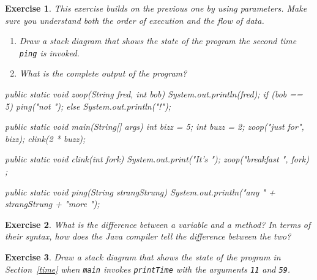 \documentclass[12pt]{book}
\theoremstyle{exercise}
\newtheorem{exercise}{Exercise}[chapter]
\newcommand{\java}[1]{\lstinline{#1}} %
\begin{document}
\begin{exercise}
This exercise builds on the previous one by using parameters.
Make sure you understand both the order of execution and the flow of data.

\begin{enumerate}

\item Draw a stack diagram that shows the state of the program the {\it second} time \java{ping} is invoked.

\item What is the complete output of the program?

\end{enumerate}

\begin{code}
    public static void zoop(String fred, int bob) {
        System.out.println(fred);
        if (bob == 5) {
            ping("not ");
        } else {
            System.out.println("!");
        }
    }

    public static void main(String[] args) {
        int bizz = 5;
        int buzz = 2;
        zoop("just for", bizz);
        clink(2 * buzz);
    }

    public static void clink(int fork) {
        System.out.print("It's ");
        zoop("breakfast ", fork) ;
    }

    public static void ping(String strangStrung) {
        System.out.println("any " + strangStrung + "more ");
    }
\end{code}
\end{exercise}

\begin{exercise}

What is the difference between a variable and a method?
In terms of their syntax, how does the Java compiler tell the difference between the two?


\end{exercise}

\begin{exercise}

Draw a stack diagram that shows the state of the program in Section~\ref{time} when \java{main} invokes \java{printTime} with the arguments \java{11} and \java{59}.

\end{exercise}
\end{document}
